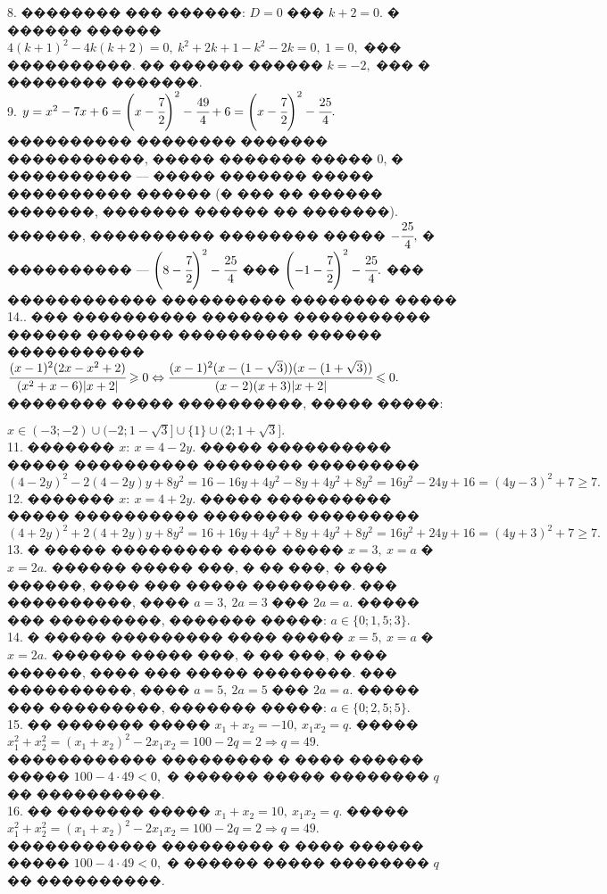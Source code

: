 \documentclass[12pt]{article}
\begin{document}
8. �������� ��� ������: $D=0$ ��� $k+2=0.$ � ������ ������ $4(k+1)^2-4k(k+2)=0,\ k^2+2k+1-k^2-2k=0,\ 1=0,$ ��� ����������. �� ������ ������ $k=-2,$ ��� � �������� �������.\\
9. $y=x^2-7x+6=\left(x-\cfrac{7}{2}\right)^2-\cfrac{49}{4}+6=\left(x-\cfrac{7}{2}\right)^2-\cfrac{25}{4}.$ ���������� �������� ������� �����������, ����� ������� ����� 0, � ���������� --- ����� ������� ����� ���������� ������ (� ��� �� ������ �������, ������� ������ �� �������). ������, ���������� �������� ����� $-\cfrac{25}{4},$ � ���������� ---
$\left(8-\cfrac{7}{2}\right)^2-\cfrac{25}{4}$ ��� $\left(-1-\cfrac{7}{2}\right)^2-\cfrac{25}{4}.$ ��� ������������ ���������� �������� ����� 14.\newpage{}. ��� ���������� ������� ����������� ������ ������� ���������� ������ �����������\\ $\cfrac{(x-1)^2(2x-x^2+2)}{(x^2+x-6)|x+2|}\geqslant0\Leftrightarrow
\cfrac{(x-1)^2(x-(1-\sqrt{3}))(x-(1+\sqrt{3}))}{(x-2)(x+3)|x+2|}\leqslant0.$ �������� ����� ����������, ����� �����:
\begin{figure}[ht!]
\end{figure}
$x\in(-3;-2)\cup(-2;1-\sqrt{3}]\cup\{1\}\cup(2;1+\sqrt{3}].$\\
11. ������� $x:\ x=4-2y.$ ����� ���������� ����� ���������� �������� ��������� $(4-2y)^2-2(4-2y)y+8y^2=16-16y+4y^2-8y+4y^2+8y^2=
16y^2-24y+16=(4y-3)^2+7\geqslant7.$\\
12. ������� $x:\ x=4+2y.$ ����� ���������� ����� ���������� �������� ��������� $(4+2y)^2+2(4+2y)y+8y^2=16+16y+4y^2+8y+4y^2+8y^2=
16y^2+24y+16=(4y+3)^2+7\geqslant7.$\\
13. � ����� ��������� ���� ����� $x=3,\ x=a$ � $x=2a.$ ������ ����� ���, � �� ���, � ��� ������, ���� ��� ����� ��������. ��� ����������, ���� $a=3,\ 2a=3$ ��� $2a=a.$ ����� ��� ���������, ������� �����: $a\in\{0; 1,5;3\}.$\\
14. � ����� ��������� ���� ����� $x=5,\ x=a$ � $x=2a.$ ������ ����� ���, � �� ���, � ��� ������, ���� ��� ����� ��������. ��� ����������, ���� $a=5,\ 2a=5$ ��� $2a=a.$ ����� ��� ���������, ������� �����: $a\in\{0; 2,5;5\}.$\\
15. �� ������� ����� $x_1+x_2=-10,\ x_1x_2=q.$ ����� $x_1^2+x_2^2=(x_1+x_2)^2-2x_1x_2=100-2q=2\Rightarrow q=49.$ ������������ ��������� � ���� ������ ����� $100-4\cdot49<0,$ � ������ ����� �������� $q$ �� ����������.\\
16. �� ������� ����� $x_1+x_2=10,\ x_1x_2=q.$ ����� $x_1^2+x_2^2=(x_1+x_2)^2-2x_1x_2=100-2q=2\Rightarrow q=49.$ ������������ ��������� � ���� ������ ����� $100-4\cdot49<0,$ � ������ ����� �������� $q$ �� ����������.\\
\end{document}
